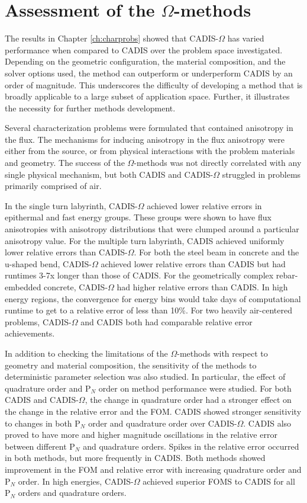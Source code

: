 \section{Assessment of the $\Omega$-methods}
\label{sec:assessments}

The results in Chapter \ref{ch:charprobs} showed that CADIS-$\Omega$ has varied
performance when compared to CADIS over the problem space investigated.
Depending on the geometric configuration, the material composition, and the
solver options used, the method can outperform or underperform CADIS by an
order of magnitude. This underscores the difficulty
of developing a method that is broadly applicable to a large subset of
application space. Further, it illustrates the necessity for further methods
development.

Several characterization problems were formulated that contained anisotropy in the
flux. The mechanisms for inducing anisotropy in the
flux anisotropy were
either from the source, or from physical interactions with the problem materials
and geometry. The success of the $\Omega$-methods was not directly correlated
with any single physical mechanism, but both CADIS and CADIS-$\Omega$ struggled
in problems primarily comprised of air.

In the single turn labyrinth, CADIS-$\Omega$ achieved lower relative errors in
epithermal and fast energy groups. These groups were shown to have flux
anisotropies with anisotropy distributions that were clumped around a particular
anisotropy value.
For the multiple turn labyrinth, CADIS achieved uniformly lower relative errors
than CADIS-$\Omega$. For both the steel beam in concrete and the u-shaped bend,
CADIS-$\Omega$ achieved lower relative errors than CADIS but had runtimes 3-7x
longer than those of CADIS. For the geometrically complex rebar-embedded
concrete, CADIS-$\Omega$ had higher relative errors than CADIS. In high energy
regions, the convergence for energy bins would take days of computational runtime
to get to a relative error of less than 10\%. For two heavily air-centered
problems, CADIS-$\Omega$ and CADIS both had comparable relative error
achievements.

In addition to checking the limitations of the $\Omega$-methods with respect to
geometry and material composition, the sensitivity of the methods to
deterministic parameter selection was also studied. In particular, the effect of
quadrature order and P$_N$ order on method performance were studied. For both CADIS and
CADIS-$\Omega$, the change in quadrature order had a stronger effect on the
change in the relative error and the FOM. CADIS showed stronger sensitivity to
changes in both P$_N$ order and quadrature order over CADIS-$\Omega$. CADIS also
proved to have more and higher magnitude oscillations in the relative error
between different P$_N$ and quadrature orders. Spikes in the relative error
occurred in both methods, but more frequently in CADIS. Both
methods showed improvement in the FOM and relative error with increasing
quadrature order and P$_N$ order.
In high energies, CADIS-$\Omega$ achieved superior FOMS to CADIS for all P$_N$
orders and quadrature orders.

